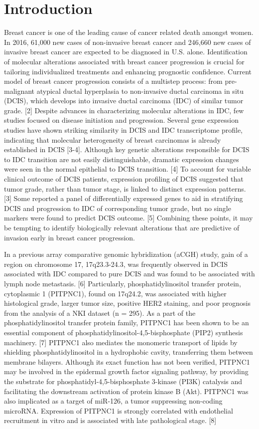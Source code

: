\documentclass[10pt,letterpaper]{article}
\begin{document}
\section*{Introduction}
Breast cancer is one of the leading cause of cancer related death amongst women. In 2016, 61,000 new cases of non-invasive breast cancer and 246,660 new cases of invasive breast cancer are expected to be diagnosed in U.S. alone. \cite{3} Identification of molecular alterations associated with breast cancer progression is crucial for tailoring individualized treatments and enhancing prognostic confidence. Current model of breast cancer progression consists of a multistep process: from pre-malignant atypical ductal hyperplasia to non-invasive ductal carcinoma in situ (DCIS), which develops into invasive ductal carcinoma (IDC) of similar tumor grade. [2] Despite advances in characterizing molecular alterations in IDC, few studies focused on disease initiation and progression. Several gene expression studies have shown striking similarity in DCIS and IDC transcriptome profile, indicating that molecular heterogeneity of breast carcinomas is already established in DCIS [3-4]. Although key genetic alterations responsible for DCIS to IDC transition are not easily distinguishable, dramatic expression changes were seen in the normal epithelial to DCIS transition. [4] To account for variable clinical outcome of DCIS patients, expression profiling of DCIS suggested that tumor grade, rather than tumor stage, is linked to distinct expression patterns. [3] Some reported a panel of differentially expressed genes to aid in stratifying DCIS and progression to IDC of corresponding tumor grade, but no single markers were found to predict DCIS outcome. [5] Combining these points, it may be tempting to identify biologically relevant alterations that are predictive of invasion early in breast cancer progression.

In a previous array comparative genomic hybridization (aCGH) study, gain of a region on chromosome 17, 17q23.3-24.3, was frequently observed in DCIS associated with IDC compared to pure DCIS and was found to be associated with lymph node metastasis. [6] Particularly, phosphatidylinositol transfer protein, cytoplasmic 1 (PITPNC1), found on 17q24.2, was associated with higher histological grade, larger tumor size, positive HER2 staining, and poor prognosis from the analysis of a NKI dataset (n = 295). As a part of the phosphatidylinositol transfer protein family, PITPNC1 has been shown to be an essential component of phosphatidylinositol-4,5-bisphosphate (PIP2) synthesis machinery. [7] PITPNC1 also mediates the monomeric transport of lipids by shielding phosphatidylinositol in a hydrophobic cavity, transferring them between membrane bilayers. Although its exact function has not been verified, PITPNC1 may be involved in the epidermal growth factor signaling pathway, by providing the substrate for phosphatidyl-4,5-bisphosphate 3-kinase (PI3K) catalysis and facilitating the downstream activation of protein kinase B (Akt). PITPNC1 was also implicated as a target of miR-126, a tumor suppressing non-coding microRNA. Expression of PITPNC1 is strongly correlated with endothelial recruitment in vitro and is associated with late pathological stage. [8]
\end{document}

